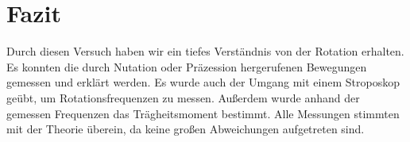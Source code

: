 \chapter{Fazit}
Durch diesen Versuch haben wir ein tiefes Verständnis von der Rotation erhalten.
Es konnten die durch Nutation oder Präzession hergerufenen Bewegungen gemessen und erklärt werden.
Es wurde auch der Umgang mit einem Stroposkop geübt, um Rotationsfrequenzen zu messen.
Außerdem wurde anhand der gemessen Frequenzen das Trägheitsmoment bestimmt.
Alle Messungen stimmten mit der Theorie überein, da keine großen Abweichungen aufgetreten sind.